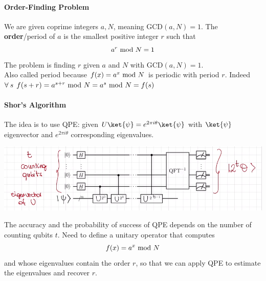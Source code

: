 \documentclass[10pt]{report}
\begin{document}
\paragraph{Order-Finding Problem} We are given coprime integers $a, N$, meaning GCD$(a,N)=1$. The \textbf{order}/period of $a$ is the smallest positive integer $r$ such that $$a^r\hbox{ mod }N = 1$$
The problem is finding $r$ given $a$ and $N$ with GCD$(a,N)=1$.\\
Also called period because $f(x) = a^x\hbox{ mod }N$ is periodic with period $r$. Indeed $\forall\:s\:\:f(s+r)=a^{s+r}\hbox{ mod }N = a^s\hbox{ mod }N = f(s)$
\paragraph{Shor's Algorithm} The idea is to use QPE: given $U\ket{\psi}=e^{2\pi i\theta}\ket{\psi}$ with $\ket{\psi}$ eigenvector and $e^{2\pi i\theta}$ corresponding eigenvalues.
\begin{center}
	\includegraphics[scale=0.5]{37.png}
\end{center}
The accuracy and the probability of success of QPE depends on the number of counting qubits $t$. Need to define a unitary operator that computes $$f(x) = a^x\hbox{ mod }N$$ and whose eigenvalues contain the order $r$, so that we can apply QPE to estimate the eigenvalues and recover $r$.
\end{document}
